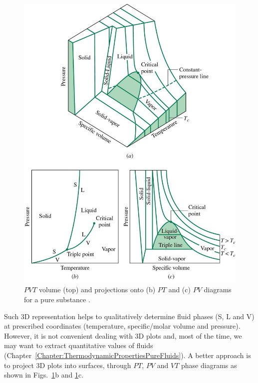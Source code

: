            \begin{figure}[h]
              \begin{center}
                 \includegraphics[width=10.cm,clip]{./Figs/PVT_Surface.jpg}
                 \caption{$PVT$ volume (top) and projections onto (b) $PT$ and (c) $PV$ diagrams for a pure substance \citep[Extracted from][]{Borgnakke_Book}.}\label{Chapter:VolumetricPropertiesPureSubstances:Fig:PVT_Surfaces}
              \end{center}
           \end{figure}    

Such 3D representation helps to qualitatively determine fluid phases (S, L and V) at prescribed coordinates (temperature, specific/molar volume and pressure). However, it is not convenient dealing with 3D plots and, most of the time, we may want to extract quantitative values of fluids (Chapter~\ref{Chapter:ThermodynamicPropertiesPureFluids}). A better approach is to project 3D plots into surfaces, \ie through $PT$, $PV$ and $VT$ phase diagrams as shown in Figs.~\ref{Chapter:VolumetricPropertiesPureSubstances:Fig:PVT_Surfaces}b and \ref{Chapter:VolumetricPropertiesPureSubstances:Fig:PVT_Surfaces}c.


